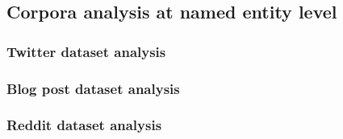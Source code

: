 % 
\subsection{Corpora analysis at named entity level}
\subsubsection{Twitter dataset analysis}
\subsubsection{Blog post dataset analysis}
\subsubsection{Reddit dataset analysis}

	
		

